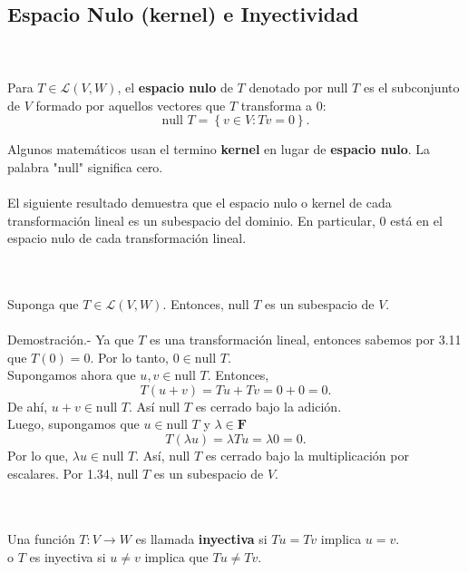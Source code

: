 \;\\
\subsection*{Espacio Nulo (kernel) e Inyectividad}


\begin{mydef}\,\\\\
    Para $T\in \mathcal{L}(V,W)$, el \textbf{espacio nulo} de $T$ denotado por null $T$ es el subconjunto de $V$ formado por aquellos vectores que $T$ transforma a $0$:
    $$\mbox{null } T = \left\{v\in V : Tv=0\right\}.$$
\end{mydef}

Algunos matemáticos usan el termino \textbf{kernel} en lugar de \textbf{espacio nulo}. La palabra "null" significa cero.\\\\

El siguiente resultado demuestra que el espacio nulo o kernel de cada transformación lineal es un subespacio del dominio. En particular, $0$ está en el espacio nulo de cada transformación lineal.

\setcounter{myteo}{13}
\begin{myteo}\,\\\\
    Suponga que $T\in \mathcal{L}(V,W)$. Entonces, null $T$ es un subespacio de $V$.\\\\
	Demostración.-\; Ya que $T$ es una transformación lineal, entonces sabemos por 3.11 que $T(0)=0$. Por lo tanto, $0\in \mbox{null } T.$\\
	Supongamos ahora que $u,v\in \mbox{null } T$. Entonces,
	$$T(u+v)=Tu+Tv=0+0=0.$$
	De ahí, $u+v\in \mbox{null } T$. Así null $T$ es cerrado bajo la adición.\\
	Luego, supongamos que $u\in \mbox{null }T$ y $\lambda \in \textbf{F}$
	$$T(\lambda u)=\lambda T u=\lambda 0 = 0.$$
	Por lo que, $\lambda u \in \mbox{null } T$. Así, null $T$ es cerrado bajo la multiplicación por escalares. Por 1.34, null $T$ es un subespacio de $V.$
\end{myteo}

\begin{mydef}[Inyectiva]\,\\\\
    Una función $T:V\to W$ es llamada \textbf{inyectiva} si $Tu=Tv$ implica $u=v$.\\

    o $T$ es inyectiva si $u\neq v$ implica que $Tu\neq Tv$.\\\\
\end{mydef}

